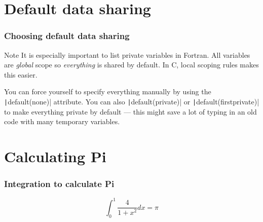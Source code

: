 \documentclass{beamer}
\begin{document}
\section{Default data sharing}
\begin{frame}
\frametitle{Choosing default data sharing}
\begin{alertblock}{Note}
It is especially important to list private variables in Fortran.
All variables are \emph{global} scope so \emph{everything} is shared by default.
In C, local scoping rules makes this easier.
\end{alertblock}

You can force yourself to specify everything manually by using the \texttt|default(none)| attribute.
You can also \texttt|default(private)| or \texttt|default(firstprivate)| to make everything private by default --- this might save a lot of typing in an old code with many temporary variables.

\end{frame}

\section{Calculating Pi}
\begin{frame}
\frametitle{Integration to calculate Pi}
$$\int_{0}^{1} \frac{4}{1+x^2} dx = \pi$$

\end{frame}
\end{document}
